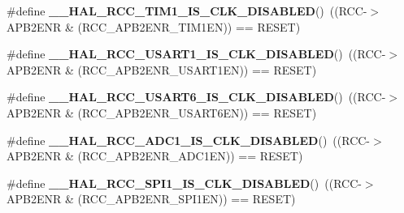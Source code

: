 \begin{DoxyCompactItemize}
\#define {\bfseries \+\_\+\+\_\+\+H\+A\+L\+\_\+\+R\+C\+C\+\_\+\+T\+I\+M1\+\_\+\+I\+S\+\_\+\+C\+L\+K\+\_\+\+D\+I\+S\+A\+B\+L\+ED}()~((R\+CC-\/$>$A\+P\+B2\+E\+NR \& (R\+C\+C\+\_\+\+A\+P\+B2\+E\+N\+R\+\_\+\+T\+I\+M1\+EN)) == R\+E\+S\+ET)
\item 
\mbox{\label{group___r_c_c___a_p_b2___peripheral___clock___enable___disable___status_ga22c9d59ac6062298a71eed0d6a4a9afd}} 
\#define {\bfseries \+\_\+\+\_\+\+H\+A\+L\+\_\+\+R\+C\+C\+\_\+\+U\+S\+A\+R\+T1\+\_\+\+I\+S\+\_\+\+C\+L\+K\+\_\+\+D\+I\+S\+A\+B\+L\+ED}()~((R\+CC-\/$>$A\+P\+B2\+E\+NR \& (R\+C\+C\+\_\+\+A\+P\+B2\+E\+N\+R\+\_\+\+U\+S\+A\+R\+T1\+EN)) == R\+E\+S\+ET)
\item 
\mbox{\label{group___r_c_c___a_p_b2___peripheral___clock___enable___disable___status_ga0c3fd42d5fb38243e195ed04d7390672}} 
\#define {\bfseries \+\_\+\+\_\+\+H\+A\+L\+\_\+\+R\+C\+C\+\_\+\+U\+S\+A\+R\+T6\+\_\+\+I\+S\+\_\+\+C\+L\+K\+\_\+\+D\+I\+S\+A\+B\+L\+ED}()~((R\+CC-\/$>$A\+P\+B2\+E\+NR \& (R\+C\+C\+\_\+\+A\+P\+B2\+E\+N\+R\+\_\+\+U\+S\+A\+R\+T6\+EN)) == R\+E\+S\+ET)
\item 
\mbox{\label{group___r_c_c___a_p_b2___peripheral___clock___enable___disable___status_gac9f006a3c1b75c06270f0ae5a2c3ed07}} 
\#define {\bfseries \+\_\+\+\_\+\+H\+A\+L\+\_\+\+R\+C\+C\+\_\+\+A\+D\+C1\+\_\+\+I\+S\+\_\+\+C\+L\+K\+\_\+\+D\+I\+S\+A\+B\+L\+ED}()~((R\+CC-\/$>$A\+P\+B2\+E\+NR \& (R\+C\+C\+\_\+\+A\+P\+B2\+E\+N\+R\+\_\+\+A\+D\+C1\+EN)) == R\+E\+S\+ET)
\item 
\mbox{\label{group___r_c_c___a_p_b2___peripheral___clock___enable___disable___status_gabd506be27916f029d2214e88bc48f6df}} 
\#define {\bfseries \+\_\+\+\_\+\+H\+A\+L\+\_\+\+R\+C\+C\+\_\+\+S\+P\+I1\+\_\+\+I\+S\+\_\+\+C\+L\+K\+\_\+\+D\+I\+S\+A\+B\+L\+ED}()~((R\+CC-\/$>$A\+P\+B2\+E\+NR \& (R\+C\+C\+\_\+\+A\+P\+B2\+E\+N\+R\+\_\+\+S\+P\+I1\+EN)) == R\+E\+S\+ET)
\item 
\mbox{\label{group___r_c_c___a_p_b2___peripheral___clock___enable___disable___status_ga9f32ce5d57fe1d7a4871552d2e9a5b0e}} 

\end{DoxyCompactItemize}
